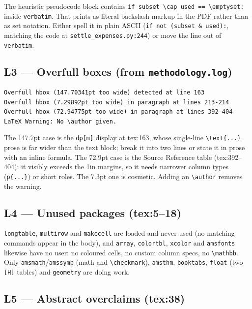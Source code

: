 \documentclass[11pt]{article}
\begin{document}
The heuristic pseudocode block contains \texttt{if subset \textbackslash cap used == \textbackslash emptyset:}
inside \texttt{verbatim}. That prints as literal backslash markup in the PDF rather than as set
notation. Either spell it in plain ASCII (\texttt{if not (subset \& used):}, matching the code at
\texttt{settle\_expenses.py:244}) or move the line out of \texttt{verbatim}.

\subsection{L3 --- Overfull boxes (from \texttt{methodology.log})}

\begin{verbatim}
Overfull hbox (147.70341pt too wide) detected at line 163
Overfull hbox (7.29892pt too wide) in paragraph at lines 213-214
Overfull hbox (72.94775pt too wide) in paragraph at lines 392-404
LaTeX Warning: No \author given.
\end{verbatim}

The 147.7pt case is the \texttt{dp[m]} display at tex:163, whose single-line \texttt{\textbackslash text\{...\}}
prose is far wider than the text block; break it into two lines or state it in prose with an inline
formula. The 72.9pt case is the Source Reference table (tex:392--404): it visibly exceeds the 1in margins,
so it needs narrower column types (\texttt{p\{...\}}) or short roles. The 7.3pt one is cosmetic.
Adding an \texttt{\textbackslash author} removes the warning.

\subsection{L4 --- Unused packages (tex:5--18)}

\texttt{longtable}, \texttt{multirow} and \texttt{makecell} are loaded and never used (no matching
commands appear in the body), and \texttt{array}, \texttt{colortbl}, \texttt{xcolor} and \texttt{amsfonts}
likewise have no user: no coloured cells, no custom column specs, no \texttt{\textbackslash mathbb}. Only
\texttt{amsmath}/\texttt{amssymb} (math and \texttt{\textbackslash checkmark}), \texttt{amsthm},
\texttt{booktabs}, \texttt{float} (two \texttt{[H]} tables) and \texttt{geometry} are doing work.

\subsection{L5 --- Abstract overclaims (tex:38)}
\end{document}

